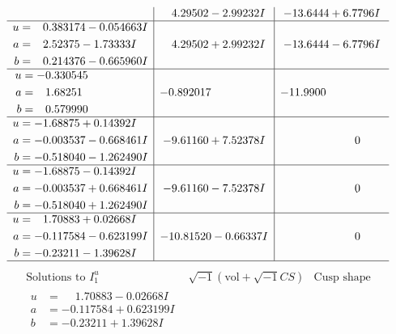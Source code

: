 \documentclass[1p]{elsarticle_modified}
\theoremstyle{definition}
\newcommand{\I}{\sqrt{-1}}
\begin{document}
$$\begin{array}{c|c|c}
 & \phantom{-}4.29502 - 2.99232 I & -13.6444 + 6.7796 I \\ \hline\begin{aligned}
u &= \phantom{-}0.383174 - 0.054663 I \\
a &= \phantom{-}2.52375 - 1.73333 I \\
b &= \phantom{-}0.214376 - 0.665960 I\end{aligned}
 & \phantom{-}4.29502 + 2.99232 I & -13.6444 - 6.7796 I \\ \hline\begin{aligned}
u &= -0.330545\phantom{ +0.000000I} \\
a &= \phantom{-}1.68251\phantom{ +0.000000I} \\
b &= \phantom{-}0.579990\phantom{ +0.000000I}\end{aligned}
 & -0.892017\phantom{ +0.000000I} & -11.9900\phantom{ +0.000000I} \\ \hline\begin{aligned}
u &= -1.68875 + 0.14392 I \\
a &= -0.003537 - 0.668461 I \\
b &= -0.518040 - 1.262490 I\end{aligned}
 & -9.61160 + 7.52378 I & \phantom{-0.000000 } 0 \\ \hline\begin{aligned}
u &= -1.68875 - 0.14392 I \\
a &= -0.003537 + 0.668461 I \\
b &= -0.518040 + 1.262490 I\end{aligned}
 & -9.61160 - 7.52378 I & \phantom{-0.000000 } 0 \\ \hline\begin{aligned}
u &= \phantom{-}1.70883 + 0.02668 I \\
a &= -0.117584 - 0.623199 I \\
b &= -0.23211 - 1.39628 I\end{aligned}
 & -10.81520 - 0.66337 I & \phantom{-0.000000 } 0\\
 \hline 
 \end{array}$$\newpage$$\begin{array}{c|c|c}  
\text{Solutions to }I^u_{1}& \I (\text{vol} + \sqrt{-1}CS) & \text{Cusp shape}\\
 \hline 
\begin{aligned}
u &= \phantom{-}1.70883 - 0.02668 I \\
a &= -0.117584 + 0.623199 I \\
b &= -0.23211 + 1.39628 I\end{aligned}

\end{array}$$
\end{document}
